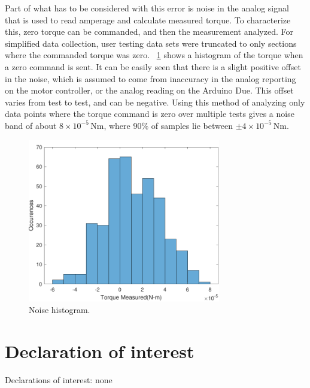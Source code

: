 \documentclass[11pt, letterpaper]{article}
\begin{document}
Part of what has to be considered with this error is noise in the analog signal that is used to read amperage and calculate measured torque.
To characterize this, zero torque can be commanded, and then the measurement analyzed.  
For simplified data collection, user testing data sets were truncated to only sections where the commanded torque was zero.
\figurename~\ref{fig:NoiseHistogram} shows a histogram of the torque when a zero command is sent.
It can be easily seen that there is a slight positive offset in the noise, which is assumed to come from inaccuracy in the analog reporting on the motor controller, or the analog reading on the Arduino Due.
This offset varies from test to test, and can be negative.
Using this method of analyzing only data points where the torque command is zero over multiple tests gives a noise band of about $8 \times 10^{-5}$\,Nm, where 90\% of samples lie between $\pm 4 \times 10^{-5}$\,Nm.

\begin{figure}[tb]
  \centering
  \includegraphics[width=0.75\textwidth]{diagrams/NoiseHistogram.pdf}
  \caption{Noise histogram.}
  \label{fig:NoiseHistogram}
\end{figure}


\section{Declaration of interest}
Declarations of interest: none
\end{document}
